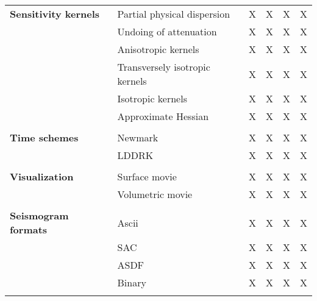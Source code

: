 \begin{table}[htp]
\begin{center}
\begin{tabular}{ l l c c c c}
{\bf Sensitivity kernels} & Partial physical dispersion     & X  & X  & X  & X \\
                          & Undoing of attenuation          & X  & X  & X  & X \\
                          & Anisotropic kernels             & X  & X  & X  & X \\
                          & Transversely isotropic kernels  & X  & X  & X  & X \\
                          & Isotropic kernels               & X  & X  & X  & X \\
                          & Approximate Hessian             & X  & X  & X  & X \\
\hline
& & & & & \\
{\bf Time schemes}  & Newmark   & X  & X  & X  & X \\
                    & LDDRK     & X  & X  & X  & X \\
\hline
& & & & & \\
{\bf Visualization} & Surface movie     & X  & X  & X  & X \\
                    & Volumetric movie  & X  & X  & X  & X \\
\hline
& & & & & \\
{\bf Seismogram formats}  & Ascii     & X  & X  & X  & X \\
                          & SAC       & X  & X  & X  & X \\
                          & ASDF      & X  & X  & X  & X \\
                          & Binary    & X  & X  & X  & X \\
%
\hline
& & & & & \\ %
\end{tabular}
\end{center}
\end{table}


